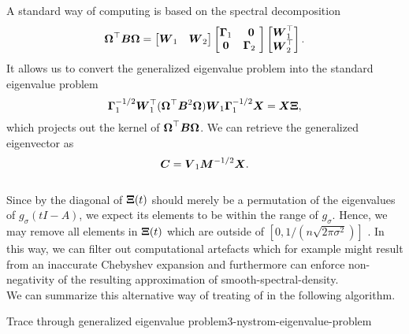 A standard way of computing 
is based on the spectral decomposition
\begin{equation}
    \boldsymbol{\Omega}^{\top} \boldsymbol{B} \boldsymbol{\Omega} = \begin{bmatrix} \boldsymbol{W}_1 & \boldsymbol{W}_2 \end{bmatrix} 
    \begin{bmatrix} \boldsymbol{\Gamma}_1 & \boldsymbol{0} \\ \boldsymbol{0} & \boldsymbol{\Gamma}_2 \ \end{bmatrix} 
    \begin{bmatrix} \boldsymbol{W}_1^{\top} \\ \boldsymbol{W}_2^{\top} \end{bmatrix}.
\end{equation}
It allows us to convert the generalized eigenvalue problem 
into the standard eigenvalue problem
\begin{equation}
    \boldsymbol{\Gamma}_1^{-1/2} \boldsymbol{W}_1^{\top} (\boldsymbol{\Omega}^{\top} \boldsymbol{B}^2 \boldsymbol{\Omega}) \boldsymbol{W}_1 \boldsymbol{\Gamma}_1^{-1/2} \boldsymbol{X} = \boldsymbol{X} \boldsymbol{\Xi},
    \label{equ:3-nystrom-converted-generalized-eigenvalue-problem}
\end{equation}
which projects out the kernel of $\boldsymbol{\Omega}^{\top} \boldsymbol{B} \boldsymbol{\Omega}$.
We can retrieve the generalized eigenvector as
\begin{equation}
    \boldsymbol{C} = \boldsymbol{V}_1 \boldsymbol{M}^{-1/2} \boldsymbol{X}.
    \label{equ:3-nystrom-generalized-eigenvector}
\end{equation}\\

Since by  the diagonal of $\boldsymbol{\Xi}(t)$
should merely be a permutation of the eigenvalues of $g_{\sigma}(tI - A)$,
we expect its elements to be within the range of $g_{\sigma}$. Hence, we may remove
all elements in $\boldsymbol{\Xi}(t)$ which are outside of $[0, 1 / (n \sqrt{2 \pi \sigma^2})]$ \cite{lin2017randomized}.
In this way, we can filter out computational artefacts which for example might result
from an inaccurate Chebyshev expansion and furthermore 
can enforce non-negativity of the resulting approximation of
\gls{smooth-spectral-density}.\\

We can summarize this alternative way of treating
 of 
in the following algorithm.
\begin{algo}{Trace through generalized eigenvalue problem}{3-nystrom-eigenvalue-problem}
    
\end{algo}

